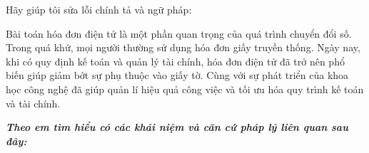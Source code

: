 Hãy giúp tôi sửa lỗi chính tả và ngữ pháp:






Bài toán hóa đơn điện tử là một phần quan trọng của quá trình chuyển đổi số. Trong quá khứ, mọi người thường sử dụng hóa đơn giấy truyền thống. Ngày nay, khi có quy định kế toán và quản lý tài chính, hóa đơn điện tử đã trở nên phổ biến giúp giảm bớt sự phụ thuộc vào giấy tờ. Cùng với sự phát triển của khoa học công nghệ đã giúp quản lí hiệu quả công việc và tối ưu hóa quy trình kế toán và tài chính. 

\textbf{\textit{Theo em tìm hiểu có các khái niệm và căn cứ pháp lý liên quan sau đây:}}  


